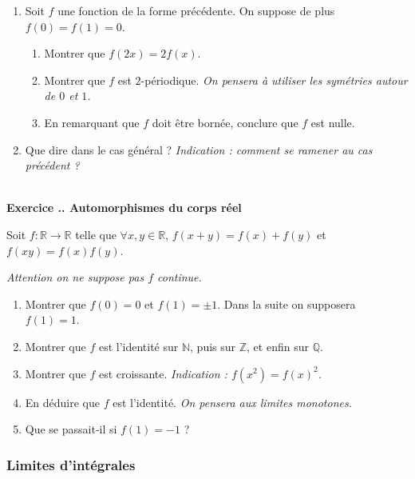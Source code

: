 \documentclass{article}
\newcommand{\mb}[1]{\mathbb{#1}}
\newcounter{exo}
\newcommand{\exercice}[1][\null]{\textbf{\\ Exercice \thesection.\theexo. #1} \addtocounter{exo}{1}}
\begin{document}
\begin{enumerate}

\item Soit $f$ une fonction de la forme précédente. On suppose de plus $f(0) = f(1) = 0$.

\begin{enumerate}

\item Montrer que $f(2x) = 2 f(x)$.

\item Montrer que $f$ est $2$-périodique. \emph{On pensera à utiliser les symétries autour de $0$ et $1$.}

\item En remarquant que $f$ doit être bornée, conclure que $f$ est nulle.

\end{enumerate}

\item Que dire dans le cas général ? \emph{Indication : comment se ramener au cas précédent ?}

\end{enumerate}


\exercice[Automorphismes du corps réel]

Soit $f : \mb{R} \rightarrow \mb{R}$ telle que $\forall x,y \in \mb{R}$, $f(x+y) = f(x) + f(y)$ et $f(xy) = f(x) f(y)$.

\emph{Attention on ne suppose pas $f$ continue.} 

\begin{enumerate}

\item Montrer que $f(0) = 0$ et $f(1) = \pm 1$. Dans la suite on supposera $f(1) = 1$.

\item Montrer que $f$ est l'identité sur $\mb{N}$, puis sur $\mb{Z}$, et enfin sur $\mb{Q}$.

\item Montrer que $f$ est croissante. \emph{Indication : $f(x^2) = f(x)^2$.}

\item En déduire que $f$ est l'identité. \emph{On pensera aux limites monotones.}

\item Que se passait-il si $f(1) = -1$ ?

\end{enumerate}



\subsubsection{Limites d'intégrales}
\end{document}

